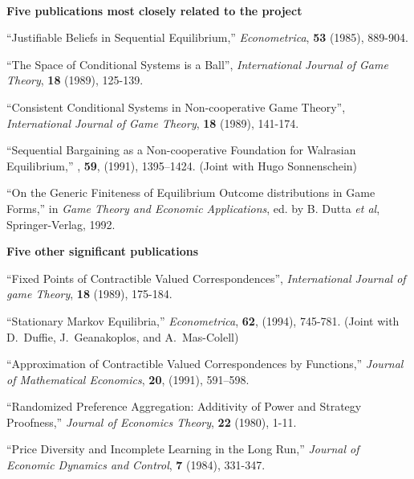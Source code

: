 \documentclass[12pt]{article}
\begin{document}
\ \\
\noindent
{\bf Five publications most closely related to the project}
\begin{description}

\item
``Justifiable Beliefs in Sequential Equilibrium,'' {\it
Econometrica}, {\bf 53} (1985), 889-904.

\item
``The Space of Conditional Systems is a Ball'',
{\it International Journal of Game Theory}, {\bf 18} (1989),
125-139.

\item
``Consistent Conditional Systems in
Non-cooperative Game Theory'', {\it International Journal of Game
Theory}, {\bf 18} (1989), 141-174.

\item
``Sequential Bargaining as a Non-cooperative
Foundation for Walrasian Equilibrium,'' ,
{\bf 59}, (1991), 1395--1424.  (Joint with Hugo Sonnenschein)

\item
``On the Generic Finiteness of Equilibrium Outcome
distributions in Game Forms,'' in {\it Game Theory and Economic
Applications}, ed. by B. Dutta {\it et al}, Springer-Verlag, 1992.


\end{description}

\noindent
{\bf Five other significant publications}
\begin{description}
\item
``Fixed Points of Contractible Valued
Correspondences'', {\it International Journal of game Theory},
{\bf 18} (1989), 175-184.

\item
``Stationary Markov Equilibria,'' {\it Econometrica}, {\bf 62},
(1994), 745-781.  (Joint with D.~Duffie, J.~Geanakoplos, and
A.~Mas-Colell)

\item
``Approximation of Contractible Valued
Correspondences by Functions,'' {\it Journal of
Mathematical Economics}, {\bf 20}, (1991), 591--598.

\item
``Randomized Preference Aggregation:  Additivity of Power and Strategy
Proofness,'' {\it Journal of Economics Theory}, {\bf 22} (1980), 1-11.

\item
``Price Diversity and Incomplete Learning in the Long Run,'' {\it Journal
of Economic Dynamics and Control}, {\bf 7} (1984), 331-347.


\end{description}
\end{document}
